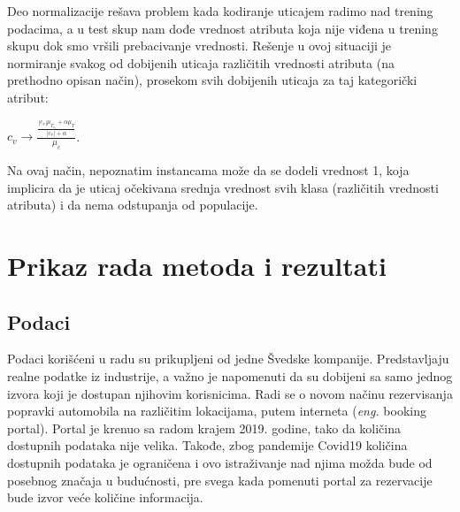 \documentclass[12pt,oneside]{memoir}
\begin{document}
Deo normalizacije rešava problem kada kodiranje uticajem radimo nad trening podacima, a u test skup nam dođe vrednost atributa koja nije viđena u trening skupu dok smo vršili prebacivanje vrednosti. Rešenje u ovoj situaciji je normiranje svakog od dobijenih uticaja različitih vrednosti atributa (na prethodno opisan način), prosekom svih dobijenih uticaja za taj kategorički atribut:
\begin{center}
$c_v \to \frac{\frac{|c_v|\mu_{T_{c_v}} + \alpha\mu_{T}}{|c_v| + \alpha}}{\mu_{c}}$.
\end{center}
Na ovaj način, nepoznatim instancama može da se dodeli vrednost 1, koja implicira da je uticaj očekivana srednja vrednost svih klasa (različitih vrednosti atributa) i da nema odstupanja od populacije.


\chapter{Prikaz rada metoda i rezultati}

\section{Podaci}
Podaci korišćeni u radu su prikupljeni od jedne Švedske kompanije. Predstavljaju realne podatke iz industrije, a važno je napomenuti da su dobijeni sa samo jednog izvora koji je dostupan njihovim korisnicima. Radi se o novom načinu rezervisanja popravki automobila na različitim lokacijama, putem interneta (\textit{eng.} booking portal). Portal je krenuo sa radom krajem 2019. godine, tako da količina dostupnih podataka nije velika. Takođe, zbog pandemije Covid19 količina dostupnih podataka je ograničena i ovo istraživanje nad njima možda bude od posebnog značaja u budućnosti, pre svega kada pomenuti portal za rezervacije bude izvor veće količine informacija.
\end{document}
